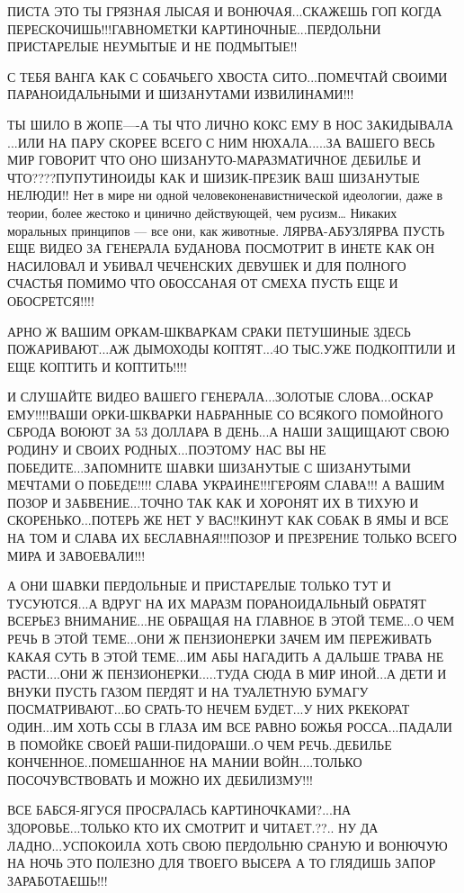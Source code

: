 ПИСТА ЭТО ТЫ ГРЯЗНАЯ ЛЫСАЯ И ВОНЮЧАЯ...СКАЖЕШЬ ГОП КОГДА
ПЕРЕСКОЧИШЬ!!!ГАВНОМЕТКИ КАРТИНОЧНЫЕ...ПЕРДОЛЬНИ ПРИСТАРЕЛЫЕ НЕУМЫТЫЕ И НЕ
ПОДМЫТЫЕ!!                       

С ТЕБЯ ВАНГА КАК С СОБАЧЬЕГО ХВОСТА СИТО...ПОМЕЧТАЙ СВОИМИ ПАРАНОИДАЛЬНЫМИ И
ШИЗАНУТАМИ ИЗВИЛИНАМИ!!!

ТЫ ШИЛО В ЖОПЕ----А ТЫ ЧТО ЛИЧНО КОКС ЕМУ В НОС ЗАКИДЫВАЛА ...ИЛИ НА ПАРУ
СКОРЕЕ ВСЕГО С НИМ НЮХАЛА.....ЗА ВАШЕГО ВЕСЬ МИР ГОВОРИТ ЧТО ОНО
ШИЗАНУТО-МАРАЗМАТИЧНОЕ ДЕБИЛЬЕ И ЧТО????ПУПУТИНОИДЫ КАК И ШИЗИК-ПРЕЗИК ВАШ
ШИЗАНУТЫЕ НЕЛЮДИ!!
Нет в мире ни одной человеконенавистнической идеологии, даже в теории, более
жестоко и цинично действующей, чем русизм… Никаких моральных принципов — все
они, как животные.
ЛЯРВА-АБУЗЛЯРВА ПУСТЬ ЕЩЕ ВИДЕО ЗА ГЕНЕРАЛА БУДАНОВА ПОСМОТРИТ В ИНЕТЕ КАК ОН
НАСИЛОВАЛ И УБИВАЛ ЧЕЧЕНСКИХ ДЕВУШЕК И ДЛЯ ПОЛНОГО СЧАСТЬЯ ПОМИМО ЧТО ОБОССАНАЯ
ОТ СМЕХА ПУСТЬ ЕЩЕ И ОБОСРЕТСЯ!!!!

АРНО Ж ВАШИМ ОРКАМ-ШКВАРКАМ СРАКИ  ПЕТУШИНЫЕ ЗДЕСЬ ПОЖАРИВАЮТ...АЖ ДЫМОХОДЫ
КОПТЯТ...4О ТЫС.УЖЕ ПОДКОПТИЛИ И ЕЩЕ КОПТИТЬ И КОПТИТЬ!!!!

И СЛУШАЙТЕ ВИДЕО ВАШЕГО ГЕНЕРАЛА...ЗОЛОТЫЕ СЛОВА...ОСКАР ЕМУ!!!!ВАШИ
ОРКИ-ШКВАРКИ НАБРАННЫЕ СО ВСЯКОГО ПОМОЙНОГО СБРОДА ВОЮЮТ ЗА 53 ДОЛЛАРА В
ДЕНЬ...А НАШИ ЗАЩИЩАЮТ СВОЮ РОДИНУ И СВОИХ РОДНЫХ...ПОЭТОМУ НАС ВЫ НЕ
ПОБЕДИТЕ...ЗАПОМНИТЕ ШАВКИ ШИЗАНУТЫЕ С ШИЗАНУТЫМИ МЕЧТАМИ О ПОБЕДЕ!!!! СЛАВА
УКРАИНЕ!!!ГЕРОЯМ СЛАВА!!! А ВАШИМ ПОЗОР И ЗАБВЕНИЕ...ТОЧНО ТАК КАК И ХОРОНЯТ ИХ
В ТИХУЮ И СКОРЕНЬКО...ПОТЕРЬ ЖЕ НЕТ У ВАС!!КИНУТ КАК СОБАК В ЯМЫ И ВСЕ НА ТОМ И
СЛАВА ИХ БЕСЛАВНАЯ!!!ПОЗОР  И ПРЕЗРЕНИЕ  ТОЛЬКО ВСЕГО МИРА И ЗАВОЕВАЛИ!!!

А ОНИ  ШАВКИ ПЕРДОЛЬНЫЕ И ПРИСТАРЕЛЫЕ ТОЛЬКО ТУТ И ТУСУЮТСЯ...А ВДРУГ НА ИХ
МАРАЗМ ПОРАНОИДАЛЬНЫЙ ОБРАТЯТ ВСЕРЬЕЗ ВНИМАНИЕ...НЕ ОБРАЩАЯ НА ГЛАВНОЕ В ЭТОЙ
ТЕМЕ...О ЧЕМ РЕЧЬ В ЭТОЙ ТЕМЕ...ОНИ Ж ПЕНЗИОНЕРКИ ЗАЧЕМ ИМ ПЕРЕЖИВАТЬ КАКАЯ
СУТЬ В ЭТОЙ ТЕМЕ...ИМ АБЫ НАГАДИТЬ А ДАЛЬШЕ ТРАВА НЕ РАСТИ....ОНИ Ж
ПЕНЗИОНЕРКИ.....ТУДА СЮДА В МИР ИНОЙ...А ДЕТИ И ВНУКИ ПУСТЬ ГАЗОМ ПЕРДЯТ И НА
ТУАЛЕТНУЮ БУМАГУ ПОСМАТРИВАЮТ...БО СРАТЬ-ТО НЕЧЕМ БУДЕТ...У НИХ РКЕКОРАТ
ОДИН...ИМ ХОТЬ ССЫ В ГЛАЗА ИМ ВСЕ РАВНО БОЖЬЯ РОССА...ПАДАЛИ В ПОМОЙКЕ СВОЕЙ
РАШИ-ПИДОРАШИ..О ЧЕМ РЕЧЬ..ДЕБИЛЬЕ КОНЧЕННОЕ..ПОМЕШАННОЕ НА МАНИИ
ВОЙН....ТОЛЬКО ПОСОЧУВСТВОВАТЬ И МОЖНО ИХ ДЕБИЛИЗМУ!!!

ВСЕ БАБСЯ-ЯГУСЯ ПРОСРАЛАСЬ КАРТИНОЧКАМИ?...НА ЗДОРОВЬЕ...ТОЛЬКО КТО ИХ СМОТРИТ
И ЧИТАЕТ.??.. НУ ДА ЛАДНО...УСПОКОИЛА ХОТЬ СВОЮ ПЕРДОЛЬНЮ СРАНУЮ И ВОНЮЧУЮ НА
НОЧЬ   ЭТО ПОЛЕЗНО ДЛЯ ТВОЕГО ВЫСЕРА А ТО ГЛЯДИШЬ ЗАПОР ЗАРАБОТАЕШЬ!!!


